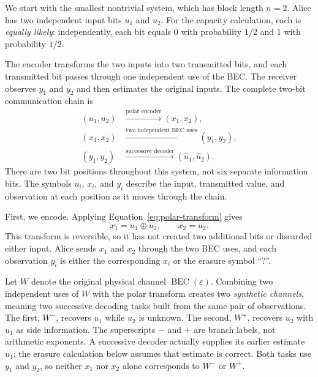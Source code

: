 We start with the smallest nontrivial system, which has block length $n=2$. Alice has two independent input bits $u_1$ and $u_2$. For the capacity calculation, each is \emph{equally likely}: independently, each bit equals $0$ with probability $1/2$ and $1$ with probability $1/2$.

The encoder transforms the two inputs into two transmitted bits, and each transmitted bit passes through one independent use of the BEC. The receiver observes $y_1$ and $y_2$ and then estimates the original inputs. The complete two-bit communication chain is
\begin{equation}
\begin{aligned}
(u_1,u_2)
&\xrightarrow{\text{polar encoder}}
(x_1,x_2),\\
(x_1,x_2)
&\xrightarrow{\text{two independent BEC uses}}
(y_1,y_2),\\
(y_1,y_2)
&\xrightarrow{\text{successive decoder}}
(\hat u_1,\hat u_2).
\end{aligned}
\label{eq:bec-two-bit-communication-chain}
\end{equation}
There are two bit positions throughout this system, not six separate information bits. The symbols $u_i$, $x_i$, and $y_i$ describe the input, transmitted value, and observation at each position as it moves through the chain.

First, we encode. Applying Equation~\eqref{eq:polar-transform} gives
\begin{equation}
x_1=u_1\oplus u_2,
\qquad
x_2=u_2.
\label{eq:bec-two-bit-encoding}
\end{equation}
This transform is reversible, so it has not created two additional bits or discarded either input. Alice sends $x_1$ and $x_2$ through the two BEC uses, and each observation $y_i$ is either the corresponding $x_i$ or the erasure symbol ``?''.

Let $W$ denote the original physical channel $\operatorname{BEC}(\varepsilon)$. Combining two independent uses of $W$ with the polar transform creates two \emph{synthetic channels}, meaning two successive decoding tasks built from the same pair of observations. The first, $W^-$, recovers $u_1$ while $u_2$ is unknown. The second, $W^+$, recovers $u_2$ with $u_1$ as side information. The superscripts $-$ and $+$ are branch labels, not arithmetic exponents. A successive decoder actually supplies its earlier estimate $\hat u_1$; the erasure calculation below assumes that estimate is correct. Both tasks use $y_1$ and $y_2$, so neither $x_1$ nor $x_2$ alone corresponds to $W^-$ or $W^+$.

